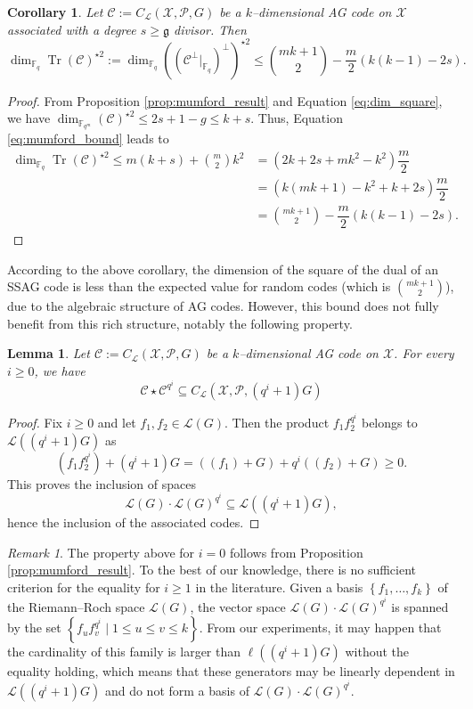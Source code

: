 \documentclass[a4paper]{amsart}
\newtheorem{coro}[thm]{Corollary}
\newtheorem{lemma}[thm]{Lemma}
\theoremstyle{definition}
\theoremstyle{remark}
\newtheorem{remark}[thm]{Remark}
\newcommand{\calL}{\mathcal{L}}
\newcommand{\calC}{\mathcal{C}}
\newcommand{\calX}{\mathcal{X}}
\newcommand{\fqm}{\mathbb{F}_{q^m}}
\newcommand{\fq}{\mathbb{F}_{q}}
\newcommand{\Tr}[1]{\operatorname{Tr}\left(#1\right)}
\newcommand{\set}[1]{\left\{#1\right\}}
\begin{document}
\begin{coro} \label{coro:1st_bound_mumford}
 Let $\mathcal{C} := C_{\calL}(\calX,\mathcal{P},G)$ be a $k$--dimensional AG code on $\calX$ associated with a degree $s \geq \mathfrak{g}$ divisor. Then
 \[ \dim_{\fq}\Tr{\calC}^{\star2} := \dim_{\fq} \left((\calC^\perp|_{\fq})^{\perp}\right)^{\star2}  \leq \binom{mk+1}{2} - \dfrac{m}{2} (k(k-1)-2s).\]
\end{coro}

\begin{proof}
 From Proposition \ref{prop:mumford_result} and Equation \eqref{eq:dim_square}, we have $\dim_{\fqm}(\calC)^{\star2} \leq 2s+1-g \leq k+s$. Thus, Equation \eqref{eq:mumford_bound} leads to
 \begin{align*}
  \dim_{\fq}\Tr{\calC}^{\star2} \leq m(k+s) + \binom{m}{2}k^2 &= (2k+2s+mk^2-k^2) \dfrac{m}{2} \\
  &= (k(mk+1)-k^2+k+2s) \dfrac{m}{2} \\
  &= \binom{mk+1}{2} - \dfrac{m}{2}(k(k-1)-2s) .
 \end{align*}
\end{proof}

According to the above corollary, the dimension of the square of the dual of an SSAG code is less than the expected value for random codes (which is $\binom{mk+1}{2}$), due to the algebraic structure of AG codes. However, this bound does not fully benefit from this rich structure, notably the following property.

\begin{lemma}\label{lem:Schur-Product-Power}
	 Let $\mathcal{C} := C_{\calL}(\calX,\mathcal{P},G)$ be a $k$--dimensional AG code on $\calX$. For every $i \geq 0$, we have
	 \[\calC \star \calC^{q^i} \subseteq C_{\calL}(\calX,\mathcal{P},(q^i+1)G)\]
\end{lemma}

\begin{proof}
	Fix $i \geq 0$ and let $f_1,f_2 \in \calL(G)$. Then the product $f_1f_2^{q^i}$ belongs to $\calL((q^i+1)G)$ as
	$$(f_1f_2^{q^i}) + (q^i+1)G = \left((f_1) + G\right) + q^i\left((f_2) + G\right) \geq 0.$$
	This proves the inclusion of spaces
	$$ \calL(G)\cdot \calL(G)^{q^i} \subseteq \calL((q^i+1)G),$$
	hence the inclusion of the associated codes.
\end{proof}

\begin{remark}
The property above for $i=0$ follows from Proposition \ref{prop:mumford_result}. To the best of our knowledge, there is no sufficient criterion for the equality for $i \geq 1$ in the literature. Given a basis $\set{f_1,\dots,f_k}$ of the Riemann--Roch space $\calL(G)$, the vector space $\calL(G)\cdot \calL(G)^{q^i}$ is spanned by the set $\set{f_u f_v^{q^i} \mid 1 \leq u \leq v \leq k}$. From our experiments, it may happen that the cardinality of this family is larger than $\ell((q^i+1)G)$ without the equality holding, which means that these generators may be linearly dependent in $\calL((q^i+1)G)$ and do not form a basis of $\calL(G)\cdot \calL(G)^{q^i}$.
\end{remark}
\end{document}
